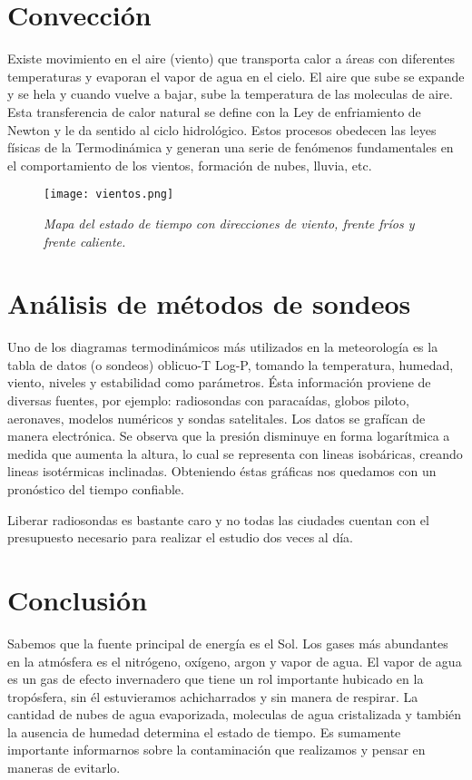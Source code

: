 \documentclass[12pt]{article}
\begin{document}
\section{Convecci\'on}
\noindent
Existe movimiento en el aire (viento) que transporta calor a \'areas con diferentes temperaturas y evaporan el vapor de agua en el cielo. El aire que sube se expande y se hela y cuando vuelve a bajar, sube la temperatura de las moleculas de aire. Esta transferencia de calor natural se define con la Ley de enfriamiento de Newton y le da sentido  al ciclo hidrol\'ogico. Estos procesos obedecen las leyes f\'isicas de la Termodin\'amica y generan una serie de fen\'omenos fundamentales en el comportamiento de  los vientos, formaci\'on de nubes, lluvia, etc.

\begin{figure}[H]
\texttt{[image: vientos.png]}
\centering
\caption{\emph{\scriptsize{Mapa del estado de tiempo con direcciones de viento, frente fr\'ios y frente caliente.}}}
\end{figure}

\section{An\'alisis de m\'etodos de sondeos}
\noindent

Uno de los diagramas termodin\'amicos m\'as utilizados en la meteorolog\'ia es la tabla de datos (o sondeos) oblicuo-T Log-P, tomando la temperatura, humedad, viento, niveles y estabilidad como par\'ametros. \'Esta informaci\'on proviene de diversas fuentes, por ejemplo: radiosondas con paraca\'idas, globos piloto, aeronaves, modelos num\'ericos y sondas satelitales. Los datos se graf\'ican de manera electr\'onica. Se observa que la presi\'on disminuye en forma logar\'itmica a medida que aumenta la altura, lo cual se representa con lineas isob\'aricas, creando lineas isot\'ermicas inclinadas. Obteniendo \'estas gr\'aficas nos quedamos con un pron\'ostico del tiempo confiable.

Liberar radiosondas es bastante caro y no todas las ciudades cuentan con el presupuesto necesario para realizar el estudio dos veces al d\'ia.

\section{Conclusi\'on}
\noindent
Sabemos que la fuente principal de energ\'ia es el Sol. Los gases m\'as abundantes en la atm\'osfera es el nitr\'ogeno, ox\'igeno, argon y vapor de agua. El vapor de agua es un gas de efecto invernadero que tiene un rol importante hubicado en la trop\'osfera, sin \'el estuvieramos achicharrados y sin manera de respirar. La cantidad de nubes de agua evaporizada, moleculas de agua cristalizada y tambi\'en la ausencia de humedad determina el estado de tiempo. Es sumamente importante informarnos sobre la contaminaci\'on que realizamos y pensar en maneras de evitarlo.
\end{document}
